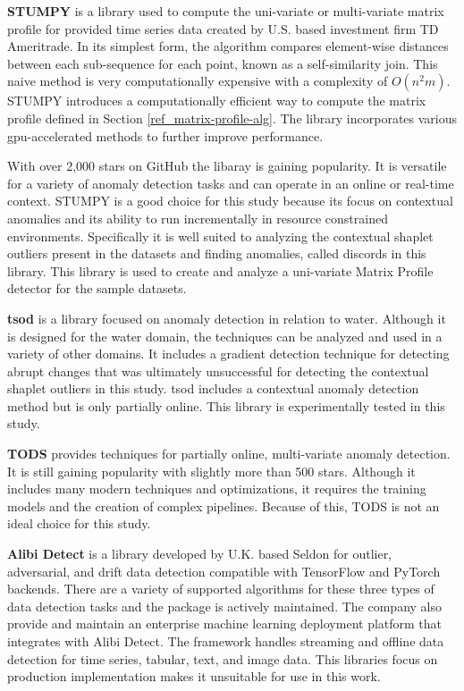 \textbf{STUMPY} \parencite{law2019stumpy} is a library used to compute the uni-variate or multi-variate matrix profile for provided time series data created by U.S. based investment firm TD Ameritrade. In its simplest form, the algorithm compares element-wise distances between each sub-sequence for each point, known as a self-similarity join. This naive method is very computationally expensive with a complexity of $O(n^2m)$. STUMPY introduces a computationally efficient way to compute the matrix profile defined in Section \ref{ref_matrix-profile-alg}. The library incorporates various gpu-accelerated methods to further improve performance.

With over 2,000 stars on GitHub the libaray is gaining popularity. It is versatile for a variety of anomaly detection tasks and can operate in an online or real-time context. STUMPY is a good choice for this study because its focus on contextual anomalies and its ability to run incrementally in resource constrained environments. Specifically it is well suited to analyzing the contextual shaplet  outliers present in the datasets and finding anomalies, called discords in this library. This library is used to create and analyze a uni-variate Matrix Profile detector for the sample datasets.

\textbf{tsod} \parencite{tsod} is a library focused on anomaly detection in relation to water. Although it is designed for the water domain, the techniques can be analyzed and used in a variety of other domains. It includes a gradient detection technique for detecting abrupt changes that was ultimately unsuccessful for detecting the contextual shaplet outliers in this study. tsod includes a contextual anomaly detection method but is only partially online. This library is experimentally tested in this study.

\textbf{TODS} \parencite{Lai_2021_TODS} provides techniques for partially online, multi-variate anomaly detection. It is still gaining popularity with slightly more than 500 stars. Although it includes many modern techniques and optimizations, it requires the training models and the creation of complex pipelines. Because of this, TODS is not an ideal choice for this study.

\textbf{Alibi Detect} \parencite{alibi-detect} is a library developed by U.K. based Seldon for outlier, adversarial, and drift data detection compatible with TensorFlow and PyTorch backends. There are a variety of supported algorithms for these three types of data detection tasks and the package is actively maintained. The company also provide and maintain an enterprise machine learning deployment platform that integrates with Alibi Detect. The framework handles streaming and offline data detection for time series, tabular, text, and image data. This libraries focus on production implementation makes it unsuitable for use in this work.

